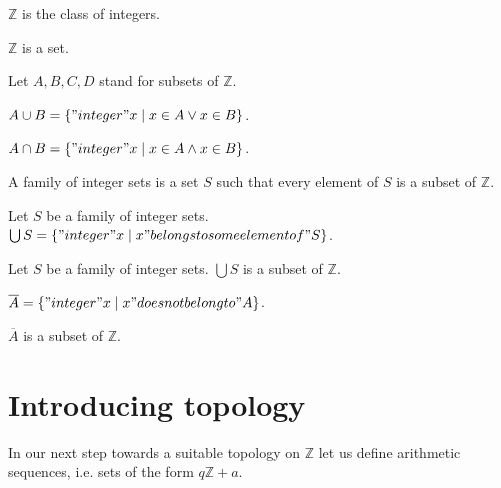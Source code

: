 \documentclass{article}
\newcommand{\Int}{\mathbb{Z}}
\begin{document}
  \begin{forthel}
    \begin{definition}
      $\Int$ is the class of integers.
    \end{definition}

    \begin{axiom}
      $\Int$ is a set.
    \end{axiom}

    Let $A,B,C,D$ stand for subsets of $\Int$.

    \begin{definition}[Union]
      $A \cup B = \{ "integer" x \mid x \in A \vee x \in B \}$.
    \end{definition}

    \begin{definition}[Intersection]
      $A \cap B = \{ "integer" x \mid x \in A \wedge x \in B \}$.
    \end{definition}

    \begin{definition}[IntegerSets]
      A family of integer sets is a set $S$ such that every element of $S$ is a subset of $\Int$.
    \end{definition}

    \begin{definition}[UnionSet]
      Let $S$ be a family of integer sets.
      $\bigcup S = \{ "integer" x \mid x "belongs to some element of" S \}$.
    \end{definition}

    \begin{lemma}
      Let $S$ be a family of integer sets. $\bigcup S$ is a subset of $\Int$.
    \end{lemma}

    \begin{definition}[Complement]
      $\overline{A} = \{ "integer" x \mid x "does not belong to" A \}$.
    \end{definition}

    \begin{lemma}
      $\overline{A}$ is a subset of $\Int$.
    \end{lemma}
   \end{forthel}


  \section{Introducing topology}

  In our next step towards a suitable topology on $\Int$ let us define arithmetic sequences, i.e. sets of the form $q \Int + a$.
\end{document}

